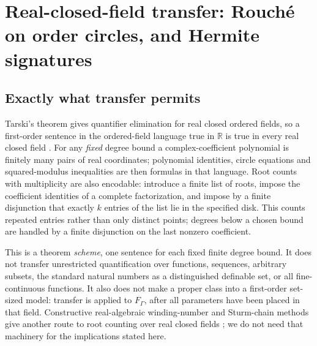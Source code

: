 \documentclass[11pt,letterpaper]{article}
\numberwithin{equation}{section}
\theoremstyle{definition}
\theoremstyle{remark}\newtheorem{remark}[theorem]{Remark}
\newcommand{\R}{\mathbb R}
\begin{document}
\section{Real-closed-field transfer: Rouch\'e on order circles, and Hermite
signatures}\label{polynomial:sec:transfer}

\subsection{Exactly what transfer permits}\label{polynomial:subsec:transferscope}
Tarski's theorem gives quantifier elimination for real closed ordered fields, so a
first-order sentence in the ordered-field language true in $\R$ is true in
every real closed field \cite{polynomial:TarskiSurvey,polynomial:Swan}. For
any \emph{fixed} degree bound a complex-coefficient polynomial is finitely
many pairs of real coordinates; polynomial identities, circle equations and
squared-modulus inequalities are then formulas in that language. Root counts
with multiplicity are also encodable: introduce a finite list of roots, impose
the coefficient identities of a complete factorization, and impose by a finite
disjunction that exactly $k$ entries of the list lie in the specified disk.
This counts repeated entries rather than only distinct points; degrees below a
chosen bound are handled by a finite disjunction on the last nonzero
coefficient.

This is a theorem \emph{scheme}, one sentence for each fixed finite degree
bound. It does not transfer unrestricted quantification over functions,
sequences, arbitrary subsets, the standard natural numbers as a distinguished
definable set, or all fine-continuous functions. It also does not make a
proper class into a first-order set-sized model: transfer is applied to
$F_\Gamma$, after all parameters have been placed in that field. Constructive
real-algebraic winding-number and Sturm-chain methods give another route to
root counting over real closed fields \cite{polynomial:Eisermann}; we do not
need that machinery for the implications stated here.
\end{document}
